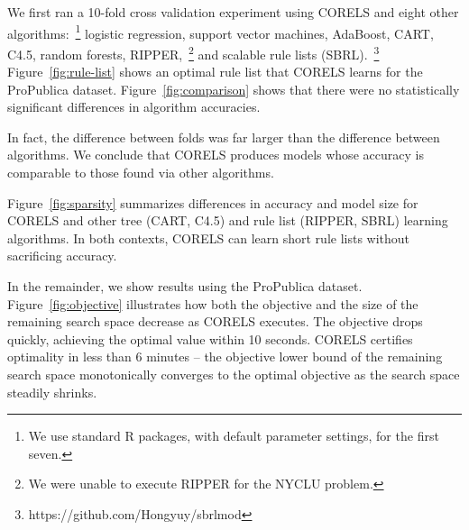 We first ran a 10-fold cross validation experiment using CORELS and eight other
algorithms:~\footnote{We use standard R packages, with default parameter settings, for the first seven.}
logistic regression, support vector machines, AdaBoost, CART, C4.5, random forests, RIPPER,~\footnote{We were unable to execute RIPPER for the NYCLU problem.} and scalable rule lists (SBRL).~\footnote{https://github.com/Hongyuy/sbrlmod}
%
Figure~\ref{fig:rule-list} shows an  optimal rule list that CORELS learns
for the ProPublica dataset.
%
Figure~\ref{fig:comparison} shows that there were no statistically significant
differences in algorithm accuracies.
\begin{arxiv}
In fact, the difference between folds was far larger than the difference
between algorithms.
We conclude that CORELS produces models whose accuracy is comparable
to those found via other algorithms.

\end{arxiv}
%
Figure~\ref{fig:sparsity} summarizes differences in accuracy and model size
for CORELS and other tree (CART, C4.5) and rule list (RIPPER, SBRL) learning algorithms.
%
In both contexts, CORELS can learn short rule lists without sacrificing accuracy.

In the remainder, we show results using the ProPublica dataset.
%
Figure~\ref{fig:objective} illustrates how both the objective and the size of
the remaining search space decrease as CORELS executes.
The objective drops quickly, achieving the optimal value within 10 seconds.
CORELS certifies optimality in less than 6 minutes --
the objective lower bound of the remaining search space
monotonically converges to the optimal objective
as the search space steadily shrinks.

